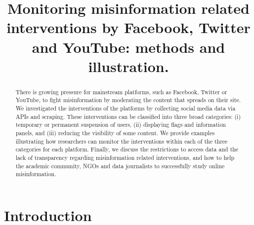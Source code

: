 \documentclass{article}
\begin{document}
\title{Monitoring misinformation related interventions by Facebook, Twitter and YouTube: methods and illustration.}

\maketitle







\begin{abstract}

There is growing pressure for mainstream platforms, such as Facebook, Twitter or YouTube, to fight misinformation by moderating the content that spreads on their site. We investigated the interventions of the platforms by collecting social media data via APIs and scraping. These interventions can be classified into three broad categories: (i) temporary or permanent suspension of users, (ii) displaying flags and information panels, and (iii) reducing the visibility of some content. We provide examples illustrating how researchers can monitor the interventions within each of the three categories for each platform. Finally, we discuss the restrictions to access data and the lack of transparency regarding misinformation related interventions, and how to help the academic community, NGOs and data journalists to successfully study online misinformation. 
\end{abstract}

\section{Introduction}
\end{document}
